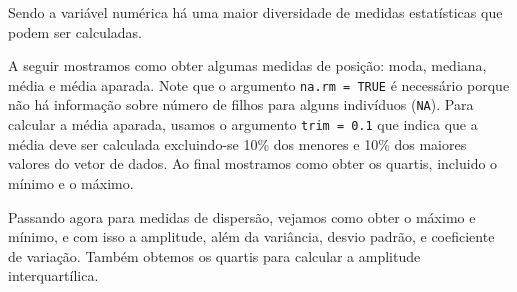\documentclass[
  10pt,
  a4paper]{book}
\newenvironment{Shaded}{\begin{snugshade}}{\end{snugshade}}
\newcommand{\AttributeTok}[1]{\textcolor[rgb]{0.77,0.63,0.00}{#1}}
\newcommand{\ConstantTok}[1]{\textcolor[rgb]{0.00,0.00,0.00}{#1}}
\newcommand{\DecValTok}[1]{\textcolor[rgb]{0.00,0.00,0.81}{#1}}
\newcommand{\DocumentationTok}[1]{\textcolor[rgb]{0.56,0.35,0.01}{\textbf{\textit{#1}}}}
\newcommand{\FloatTok}[1]{\textcolor[rgb]{0.00,0.00,0.81}{#1}}
\newcommand{\FunctionTok}[1]{\textcolor[rgb]{0.00,0.00,0.00}{#1}}
\newcommand{\NormalTok}[1]{#1}
\newcommand{\SpecialCharTok}[1]{\textcolor[rgb]{0.00,0.00,0.00}{#1}}
\newcommand{\StringTok}[1]{\textcolor[rgb]{0.31,0.60,0.02}{#1}}
\begin{document}
Sendo a variável numérica há uma maior diversidade de medidas
estatísticas que podem ser calculadas.

A seguir mostramos como obter algumas medidas de posição: moda, mediana,
média e média aparada. Note que o argumento \texttt{na.rm\ =\ TRUE} é necessário
porque não há informação sobre número de filhos para alguns indivíduos
(\texttt{NA}). Para calcular a média aparada, usamos o argumento \texttt{trim\ =\ 0.1}
que indica que a média deve ser calculada excluindo-se 10\% dos menores e
10\% dos maiores valores do vetor de dados. Ao final mostramos como obter
os quartis, incluido o mínimo e o máximo.

\begin{Shaded}
\end{Shaded}

Passando agora para medidas de dispersão, vejamos como obter o máximo e
mínimo, e com isso a amplitude, além da variância, desvio padrão, e
coeficiente de variação. Também obtemos os quartis para calcular a
amplitude interquartílica.
\end{document}
